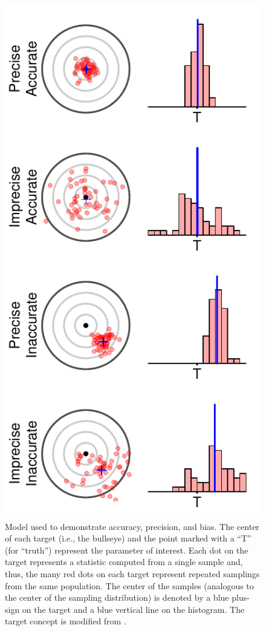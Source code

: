 \documentclass[10pt,openany]{book}\usepackage[]{graphicx}\usepackage[]{color}
\newenvironment{knitrout}{}{} %
\begin{document}
\begin{knitrout}
\color{fgcolor}\begin{figure}[hbtp]

{\centering \includegraphics[width=.4\linewidth]{Figs/AccPrec-1} 

}

\caption[Accuracy and precision model]{Model used to demonstrate accuracy, precision, and bias. The center of each target (i.e., the bullseye) and the point marked with a ``T'' (for ``truth'') represent the parameter of interest. Each dot on the target represents a statistic computed from a single sample and, thus, the many red dots on each target represent repeated samplings from the same population. The center of the samples (analogous to the center of the sampling distribution) is denoted by a blue plus-sign on the target and a blue vertical line on the histogram. The target concept is modified from \cite{RattiGarton94}.}\label{fig:AccPrec}
\end{figure}


\end{knitrout}
\end{document}
